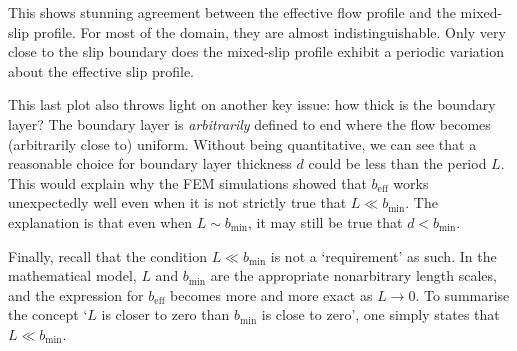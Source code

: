 \documentclass[a4paper]{report}
\newcommand{\beff}{\ensuremath{b_{\mathrm{eff}}}}
\newcommand{\bmin}{\ensuremath{b_{\mathrm{min}}}}
\begin{document}
\begin{center}
\end{center}

This shows stunning agreement between the effective flow profile and the mixed-slip profile.  For most of the domain, they are almost indistinguishable.  Only very close to the slip boundary does the mixed-slip profile exhibit a periodic variation about the effective slip profile.

\vspace{1em}

This last plot also throws light on another key issue: how thick is the boundary layer?  The boundary layer is \emph{arbitrarily} defined to end where the flow becomes (arbitrarily close to) uniform.  Without being quantitative, we can see that a reasonable choice for boundary layer thickness $d$ could be less than the period $L$.  This would explain why the FEM simulations showed that $\beff$ works unexpectedly well even when it is not strictly true that $L \ll \bmin$.  The explanation is that even when $L \sim \bmin$, it may still be true that $d < \bmin$.  

Finally, recall that the condition $L \ll \bmin$ is not a `requirement' as such.  In the mathematical model, $L$ and $\bmin$ are the appropriate nonarbitrary length scales, and the expression for $\beff$ becomes more and more exact as $L \to 0$.  To summarise the concept `$L$ is closer to zero than $\bmin$ is close to zero', one simply states that $L \ll \bmin$.
\end{document}
